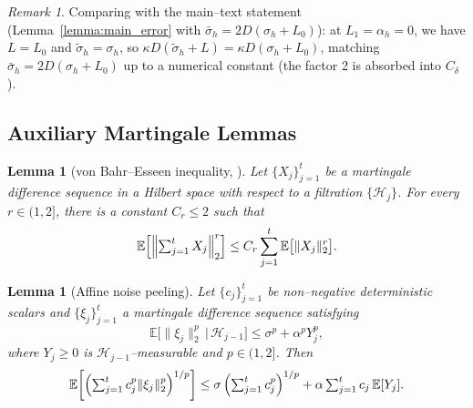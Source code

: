 \documentclass{article}
\theoremstyle{plain}
\newtheorem{lemma}[theorem]{Lemma}
\theoremstyle{definition}
\theoremstyle{remark}
\newtheorem{remark}[theorem]{Remark}
\begin{document}
\begin{remark}
Comparing with the main--text statement
(Lemma~\ref{lemma:main_error} with $\bar\sigma_h = 2D(\sigma_h + L_0)$):
at $L_1 = \alpha_h = 0$, we have $L = L_0$ and $\tilde\sigma_h =
\sigma_h$, so $\kappa D(\tilde\sigma_h + L) = \kappa D(\sigma_h + L_0)$,
matching $\bar\sigma_h = 2D(\sigma_h + L_0)$ up to a numerical constant
(the factor 2 is absorbed into $C_\delta$).
\end{remark}


\subsection{Auxiliary Martingale Lemmas}
\label{app:martingale}

\begin{lemma}[von Bahr--Esseen inequality, \citet{vonbahr1965}]
\label{lem:app:vbe}
Let $\{X_j\}_{j=1}^t$ be a martingale difference sequence in a Hilbert
space with respect to a filtration $\{\mathcal{H}_j\}$. For every
$r \in (1, 2]$, there is a constant $C_r \leq 2$ such that
\begin{equation}
  \mathbb{E}\!\left[\Bigl\|\textstyle\sum_{j=1}^t X_j\Bigr\|_2^r\right]
  \leq C_r \sum_{j=1}^t \mathbb{E}\bigl[\|X_j\|_2^r\bigr].
  \label{eq:app:vbe}
\end{equation}
\end{lemma}

\begin{lemma}[Affine noise peeling]
\label{lem:app:peeling}
Let $\{c_j\}_{j=1}^t$ be non--negative deterministic scalars and
$\{\xi_j\}_{j=1}^t$ a martingale difference sequence satisfying
\[
  \mathbb{E}\bigl[\|\xi_j\|_2^p \,\big|\, \mathcal{H}_{j-1}\bigr]
  \leq \sigma^p + \alpha^p Y_j^p,
\]
where $Y_j \geq 0$ is $\mathcal{H}_{j-1}$--measurable and $p \in (1, 2]$.
Then
\begin{equation}
  \mathbb{E}\!\left[\Bigl(\textstyle\sum_{j=1}^t c_j^p \|\xi_j\|_2^p\Bigr)^{1/p}\right]
  \leq \sigma\,\Bigl(\textstyle\sum_{j=1}^t c_j^p\Bigr)^{1/p}
    + \alpha \sum_{j=1}^t c_j\, \mathbb{E}[Y_j].
  \label{eq:app:peeling}
\end{equation}
\end{lemma}
\end{document}
